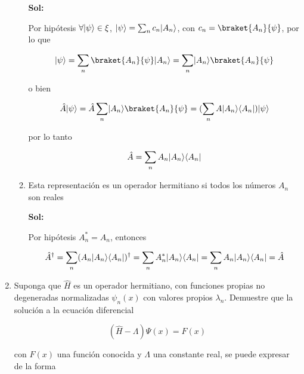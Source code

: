 \documentclass[12pt,a4paper]{article}
\DeclarePairedDelimiter\bra{\langle}{\rvert}
\DeclarePairedDelimiter\ket{\lvert}{\rangle}
\begin{document}
\begin{enumerate}
\begin{enumerate}
    \textbf{Sol:}
    
    Por hipótesis $\forall \ket{\psi} \in \xi$, $\ket{\psi} = \sum_{n} c_n \ket{A_n}$, con $c_n = \braket{A_n}{\psi}$, por lo que
    
    \begin{equation*}
        \ket{\psi} = \sum_{n} \braket{A_n}{\psi} \ket{A_n}= \sum_{n} \ket{A_n} \braket{A_n}{\psi}
    \end{equation*}
    
    o bien
    
    \begin{equation*}
        \hat{A} \ket{\psi} = \hat{A} \sum_{n} \ket{A_n} \braket{A_n}{\psi} = (\sum_{n} A \ket{A_n}\bra{A_n}) \ket{\psi}
    \end{equation*}
    
    por lo tanto
    
    \begin{equation*}
        \hat{A} = \sum_{n} A_n \ket{A_n} \bra{A_n}
    \end{equation*}
    
    \item Esta representación es un operador hermitiano si todos los números $A_n$ son reales
    
    \textbf{Sol:}
    
    Por hipótesis $A_{n}^{*}= A_{n}$, entonces
    
    \begin{equation*}
        \hat{A}^{\dagger} = \sum_{n} (A_n \ket{A_n}\bra{A_n})^{\dagger} = \sum_{n} A_{n}^{*} \ket{A_n} \bra{A_n} = \sum_{n} A_n \ket{A_n} \bra{A_n} = \hat{A}
    \end{equation*}
    
\end{enumerate}






\item Suponga que $\hat{H}$ es un operador hermitiano, con funciones propias no degeneradas normalizadas $\psi_{n}(x)$ con valores propios $\lambda_n$. Demuestre que la solución a la ecuación diferencial

\begin{equation*}
    (\hat{H} - \Lambda) \Psi (x) = F(x)
\end{equation*}

con $F(x)$ una función conocida y $\Lambda$ una constante real, se puede expresar de la forma


\end{enumerate}
\end{document}
